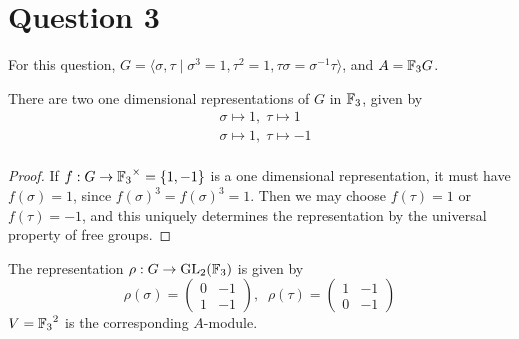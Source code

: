 \documentclass{unswmaths}
\begin{document}
\section*{Question 3}
For this question, $G = \langle \sigma,\tau\;|\;\sigma^3=1,\tau^2=1,\tau\sigma = \sigma^{-1}\tau\rangle$,
and $A = {\mathbb{F}_3} G$.

\begin{theorem}
\label{1dimreps}
    There are two one dimensional representations of $G$ in ${\mathbb{F}_3}$, given by
    \begin{align*}
        &\sigma\mapsto 1,\;\tau\mapsto 1\\
        &\sigma\mapsto 1,\;\tau\mapsto -1\\
    \end{align*}
\end{theorem}
\begin{proof}
        If $f:G\rightarrow {\mathbb{F}_3}^\times = \{1,-1\}$ is a one dimensional representation, it
        must have $f(\sigma) = 1$, since $f(\sigma)^3 = f(\sigma)^3 = 1$. 
        Then we may choose $f(\tau) = 1$ or $f(\tau) = -1$, and this uniquely
        determines the representation by the universal property of free groups.
\end{proof}

\begin{definition}
    The representation $\rho:G\rightarrow \operatorname{GL}_2({\mathbb{F}_3})$ is given by
    \begin{equation*}
        \rho(\sigma) = \begin{pmatrix}
            0 & -1\\
            1 & -1
        \end{pmatrix},\;\;
        \rho(\tau) = \begin{pmatrix}
            1 & -1\\
            0 & -1
        \end{pmatrix}
    \end{equation*}
    $V = {\mathbb{F}_3}^2$ is the corresponding $A$-module.
\end{definition}
\end{document}
